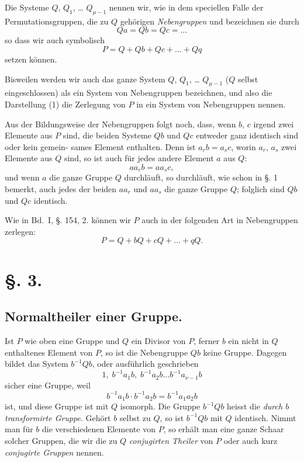 \documentclass[12pt,a4paper]{article}
\theoremstyle{plain}
\theoremstyle{definition}
\theoremstyle{remark}
\begin{document}
Die Systeme $Q$, $Q_1$, \dots{} $Q_{\mu-1}$ nennen wir, wie in dem
speciellen Falle der Permutationsgruppen, die zu $Q$ gehörigen
\emph{Nebengruppen} und bezeichnen sie durch
\[
Qa = Qb = Qc = \dots{}
\]
so dass wir auch symbolisch
\begin{equation}
P = Q + Qb + Qc + \dots{} + Qq
\end{equation}
setzen können.

Bisweilen werden wir auch das ganze System $Q$, $Q_1$, \dots{}
$Q_{\mu-1}$ ($Q$ selbst eingeschlossen) als ein System von Nebengruppen
bezeichnen, und also die Darstellung (1) die Zerlegung von $P$
in ein System von Nebengruppen nennen.

Aus der Bildungsweise der Nebengruppen folgt noch, dass,
wenn $b$, $c$ irgend zwei Elemente aus $P$ sind, die beiden Systeme
$Qb$ und $Qc$ entweder ganz identisch sind oder kein gemein-
sames Element enthalten. Denn ist $a_r b = a_s c$, worin $a_r$, $a_s$
zwei Elemente aus $Q$ sind, so ist auch für jedes andere Element
$a$ aus $Q$:
\[
aa_r b = aa_s c,
\]
und wenn $a$ die ganze Gruppe $Q$ durchläuft, so durchläuft, wie
schon in \S. 1 bemerkt, auch jedes der beiden $aa_r$ und $aa_s$ die
ganze Gruppe $Q$; folglich sind $Qb$ und $Qc$ identisch.

Wie in Bd.~I, \S. 154, 2. können wir $P$ auch in der folgenden
Art in Nebengruppen zerlegen:
\[
P = Q + bQ + cQ + \dots{} + qQ.
\]

\newpage

\section*{\S. 3.}
\subsection*{Normaltheiler einer Gruppe.}

Ist $P$ wie oben eine Gruppe und $Q$ ein Divisor von $P$,
ferner $b$ ein nicht in $Q$ enthaltenes Element von $P$, so ist die
Nebengruppe $Qb$ keine Gruppe. Dagegen bildet das System
$b^{-1} Qb$, oder ausführlich geschrieben
\[
1, \; b^{-1} a_1 b, \; b^{-1} a_2 b \dots{} b^{-1} a_{\nu-1} b
\]
sicher eine Gruppe, weil
\[
b^{-1} a_1 b \cdot b^{-1} a_2 b = b^{-1} a_1 a_2 b
\]
ist, und diese Gruppe ist mit $Q$ isomorph. Die Gruppe $b^{-1} Qb$
heisst die \emph{durch $b$ transformirte Gruppe}. Gehört $b$ selbst
zu $Q$, so ist $b^{-1} Qb$ mit $Q$ identisch. Nimmt man für $b$ die
verschiedenen Elemente von $P$, so erhält man eine ganze Schaar
solcher Gruppen, die wir die zu $Q$ \emph{conjugirten Theiler} von
$P$ oder auch kurz \emph{conjugirte Gruppen} nennen.
\end{document}
